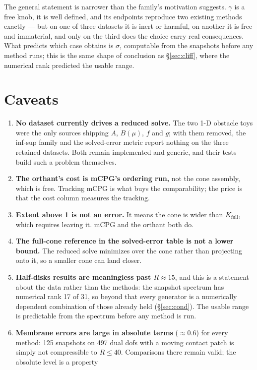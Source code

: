 \documentclass[11pt,a4paper]{article}
\newcommand{\Kfull}{K_{\mathrm{full}}}
\begin{document}
\noindent The general statement is narrower than the family's motivation suggests. $\gamma$
is a free knob, it is well defined, and its endpoints reproduce two existing methods
exactly --- but on one of three datasets it is inert or harmful, on another it is free and
immaterial, and only on the third does the choice carry real consequences. What predicts
which case obtains is $\sigma$, computable from the snapshots before any method runs; this
is the same shape of conclusion as \S\ref{sec:cliff}, where the numerical rank predicted
the usable range.

\section{Caveats}

\begin{enumerate}
\item \textbf{No dataset currently drives a reduced solve.} The two 1-D obstacle toys were
the only sources shipping $A$, $B(\mu)$, $f$ and $g$; with them removed, the inf-sup
family and the solved-error metric report nothing on the three retained datasets. Both
remain implemented and generic, and their tests build such a problem themselves.
\item \textbf{The orthant's cost is mCPG's ordering run,} not the cone assembly, which is
free. Tracking mCPG is what buys the comparability; the price is that the cost column
measures the tracking.
\item \textbf{Extent above 1 is not an error.} It means the cone is wider than $\Kfull$,
which requires leaving it. mCPG and the orthant both do.
\item \textbf{The full-cone reference in the solved-error table is not a lower bound.} The
reduced solve minimizes over the cone rather than projecting onto it, so a smaller cone can
land closer.
\item \textbf{Half-disks results are meaningless past $R\approx15$}, and this is a
statement about the data rather than the methods: the snapshot spectrum has numerical
rank 17 of 31, so beyond that every generator is a numerically dependent combination of
those already held (\S\ref{sec:cond}). The usable range is predictable from the spectrum
before any method is run.
\item \textbf{Membrane errors are large in absolute terms} ($\approx0.6$) for every
method: 125 snapshots on 497 dual dofs with a moving contact patch is simply not
compressible to $R\le40$. Comparisons there remain valid; the absolute level is a property

\end{enumerate}
\end{document}
